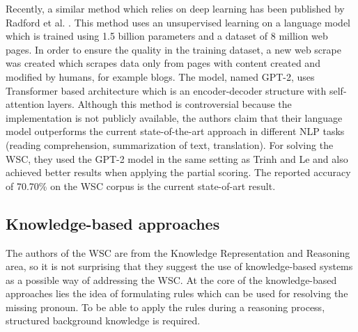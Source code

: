 Recently, a similar method which relies on deep learning has been published by Radford et al. \cite{radford2019language}. This method uses an unsupervised learning on a language model which is trained using 1.5 billion parameters and a dataset of 8 million web pages. In order to ensure the quality in the training dataset, a new web scrape was created which scrapes data only from pages with content created and modified by humans, for example blogs. The model, named GPT-2, uses Transformer based architecture \cite{DBLP:conf/nips/VaswaniSPUJGKP17} which is an encoder-decoder structure with self-attention layers. 
Although this method is controversial because the implementation is not publicly available, the authors claim that their language model outperforms the current state-of-the-art approach in different NLP tasks (reading comprehension, summarization of text, translation). For solving the WSC, they used the GPT-2 model in the same setting as Trinh and Le \cite{DBLP:journals/corr/abs-1806-02847} and also achieved better results when applying the partial scoring. The reported accuracy of 70.70\% on the WSC corpus is the current state-of-art result. 


\subsection{Knowledge-based approaches}
The authors of the WSC are from the Knowledge Representation and Reasoning area, so it is not surprising that they suggest the use of knowledge-based systems as a possible way of addressing the WSC. At the core of the knowledge-based approaches lies the idea of formulating rules which can be used for resolving the missing pronoun. To be able to apply the rules during a reasoning process, structured background knowledge is required.


